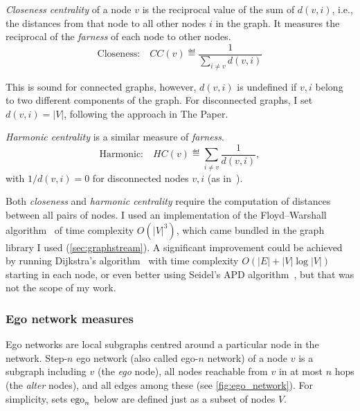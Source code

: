 \textsl{Closeness centrality} of a node $v$ is the reciprocal value of the sum of $d(v, i)$, i.e., the distances from that node to all other nodes $i$ in the graph.
It measures the reciprocal of the \textsl{farness} of each node to other nodes.
\begin{equation}
    \label{eqn:closeness_centrality}
    \text{Closeness:}\quad CC(v) \eqdef \frac{1}{\sum_{i \neq v} d(v, i)}
\end{equation}

This is sound for connected graphs, however, $d(v, i)$ is undefined if $v, i$ belong to two different components of the graph.
For disconnected graphs, I set $d(v, i) = \left\lvert V \right\rvert$, following the approach in The Paper.



\textsl{Harmonic centrality} is a similar measure of \textsl{farness}.
\begin{equation}
    \label{eqn:harmonic_centrality}
    \text{Harmonic:}\quad HC(v) \eqdef \sum_{i \neq v} \frac{1}{d(v, i)},
\end{equation}
with $1 / d(v, i) = 0$ for disconnected nodes $v, i$ (as in~\cite{MarchioriHarmonySmallworld2000}).

\begin{wrapfigure}[11]{R}{0.23\linewidth}
    
\end{wrapfigure}

Both \textsl{closeness} and \textsl{harmonic centrality} require the computation of distances between all pairs of nodes.
I used an implementation of the Floyd–Warshall algorithm~\cite{FloydAlgorithm97Shortest1962} of time complexity $O({\left\lvert V \right\rvert}^3)$, which came bundled in the graph library I used (\cref{sec:graphstream}).
A significant improvement could be achieved by running Dijkstra's algorithm~\cite{dijkstra1959note} with time complexity $O(\left\lvert E \right\rvert + \left\lvert V \right\rvert \log \left\lvert V \right\rvert )$ starting in each node, or even better using Seidel's APD algorithm~\cite{SeidelAllPairsShortestPathProblemUnweighted1995}, but that was not the scope of my work.

\subsubsection*{Ego network measures}

Ego networks are local subgraphs centred around a particular node in the network.
Step-$n$ ego network (also called ego-$n$ network) of a node $v$ is a subgraph including $v$ (the \textsl{ego} node), all nodes reachable from $v$ in at most $n$ hops (the \textsl{alter} nodes), and all edges among these (see \autoref{fig:ego_network}).
For simplicity, sets $\operatorname{ego}_n$ below are defined just as a subset of nodes $V$.

